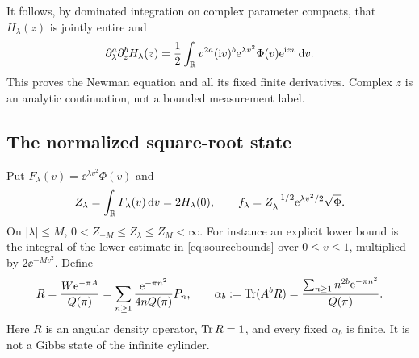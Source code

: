 It follows, by dominated integration on complex parameter compacts, that
$H_\lambda(z)$ is jointly entire and
\begin{equation}\label{eq:Hmixed}
 \partial_\lambda^a\partial_z^bH_\lambda(z)
 =\frac12\int_\mathbb R v^{2a}(\mathrm i v)^b\mathrm e^{\lambda v^2}\Phi(v)\mathrm e^{\mathrm i zv}\,\mathrm d v.
\end{equation}
This proves the Newman equation and all its fixed finite derivatives.
Complex $z$ is an analytic continuation, not a bounded measurement label.

\subsection{The normalized square-root state}
Put $F_\lambda(v)=\ee^{\lambda v^2}\Phi(v)$ and
\begin{equation}\label{eq:f}
 Z_\lambda=\int_\mathbb R F_\lambda(v)\,\mathrm d v=2H_\lambda(0),\qquad
 f_\lambda=Z_\lambda^{-1/2}\mathrm e^{\lambda v^2/2}\sqrt\Phi.
\end{equation}
On $|\lambda|\le M$, $0<Z_{-M}\le Z_\lambda\le Z_M<\infty$.
For instance an explicit lower bound is the integral of the lower estimate
in \eqref{eq:sourcebounds} over $0\le v\le1$, multiplied by
$2\ee^{-Mv^2}$. Define
\begin{equation}\label{eq:R}
 R=\frac{W\mathrm e^{-\pi A}}{Q(\pi)}
   =\sum_{n\ge1}\frac{\mathrm e^{-\pi n^2}}{4nQ(\pi)}P_n,\qquad
 \alpha_b:=\operatorname{Tr}(A^bR)=\frac{\sum_{n\ge1}n^{2b}\mathrm e^{-\pi n^2}}{Q(\pi)}.
\end{equation}
Here $R$ is an angular density operator, $\operatorname{Tr} R=1$, and every fixed
$\alpha_b$ is finite. It is not a Gibbs state of the infinite cylinder.

